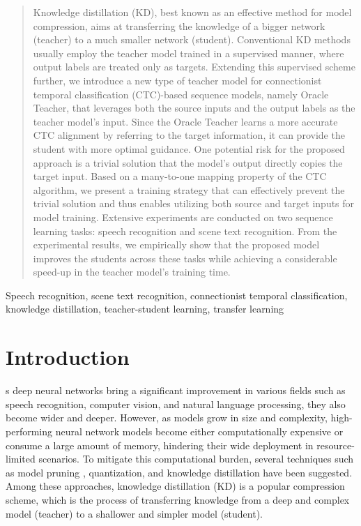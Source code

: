 \documentclass[journal]{IEEEtran}
\begin{document}
\begin{abstract}
Knowledge distillation (KD), best known as an effective method for model compression, aims at transferring the knowledge of a bigger network (teacher) to a much smaller network (student). Conventional KD methods usually employ the teacher model trained in a supervised manner, where output labels are treated only as targets. Extending this supervised scheme further, we introduce a new type of teacher model for connectionist temporal classification (CTC)-based sequence models, namely Oracle Teacher, that leverages both the source inputs and the output labels as the teacher model's input. Since the Oracle Teacher learns a more accurate CTC alignment by referring to the target information, it can provide the student with more optimal guidance. One potential risk for the proposed approach is a trivial solution that the model's output directly copies the target input. Based on a many-to-one mapping property of the CTC algorithm, we present a training strategy that can effectively prevent the trivial solution and thus enables utilizing both source and target inputs for model training. Extensive experiments are conducted on two sequence learning tasks: speech recognition and scene text recognition. From the experimental results, we empirically show that the proposed model improves the students across these tasks while achieving a considerable speed-up in the teacher model's training time.
\end{abstract}

\begin{IEEEkeywords}
Speech recognition, scene text recognition, connectionist temporal classification, knowledge distillation, teacher-student learning, transfer learning
\end{IEEEkeywords}

\IEEEpeerreviewmaketitle



\section{Introduction}

s deep neural networks bring a significant improvement in various fields such as speech recognition, computer vision, and natural language processing, they also become wider and deeper.
However, as models grow in size and complexity, high-performing neural network models become either computationally expensive or consume a large amount of memory, hindering their wide deployment in resource-limited scenarios.
To mitigate this computational burden, several techniques such as model pruning \cite{pruning1:scheme, pruning2:scheme}, quantization\cite{quantization:scheme}, and knowledge distillation \cite{bucila-et-al:scheme, hinton_kd-et-al:scheme} have been suggested.
Among these approaches, knowledge distillation (KD) is a popular compression scheme, which is the process of transferring knowledge from a deep and complex model (teacher) to a shallower and simpler model (student). 
\end{document}
